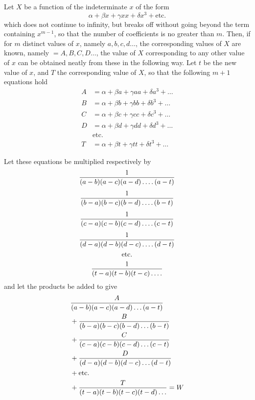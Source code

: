 \begingroup
\renewcommand{\arraystretch}{1.35}
Let $X$ be a function of the indeterminate $x$ of the form
\[
\alpha+\beta x+\gamma xx+\delta x^3+\text{etc.}
\]
which does not continue to infinity, but breaks off without going beyond the term containing $x^{m-1}$, so that the number of coefficients is no greater than $m$. Then, if for $m$ distinct values of $x$, namely $a,b,c,d\ldots$, the corresponding values of $X$ are known, namely $=A,B,C,D\ldots$, the value of $X$ corresponding to any other value of $x$ can be obtained neatly from these in the following way. Let $t$ be the new value of $x$, and $T$ the corresponding value of $X$, so that the following $m+1$ equations hold
\[
\begin{aligned}
A&=\alpha+\beta a+\gamma aa+\delta a^3+\ldots\\
B&=\alpha+\beta b+\gamma bb+\delta b^3+\ldots\\
C&=\alpha+\beta c+\gamma cc+\delta c^3+\ldots\\
D&=\alpha+\beta d+\gamma dd+\delta d^3+\ldots\\
&\text{etc.}\\
T&=\alpha+\beta t+\gamma tt+\delta t^3+\ldots
\end{aligned}
\]
\endgroup
\par
\begingroup
\renewcommand{\arraystretch}{1.45}
Let these equations be multiplied respectively by
\[
\begin{gathered}
\frac{1}{(a-b)(a-c)(a-d)\mathinner{.\,.\,.\,.}(a-t)}\\[4pt]
\frac{1}{(b-a)(b-c)(b-d)\mathinner{.\,.\,.\,.}(b-t)}\\[4pt]
\frac{1}{(c-a)(c-b)(c-d)\mathinner{.\,.\,.\,.}(c-t)}\\[4pt]
\frac{1}{(d-a)(d-b)(d-c)\mathinner{.\,.\,.\,.}(d-t)}\\
\text{etc.}\\
\frac{1}{(t-a)(t-b)(t-c)\mathinner{.\,.\,.\,.}}
\end{gathered}
\]
and let the products be added to give
\[
\begin{aligned}
&\frac{A}{(a-b)(a-c)(a-d)\mathinner{.\,.\,.}(a-t)}\\
&{}+\frac{B}{(b-a)(b-c)(b-d)\mathinner{.\,.\,.}(b-t)}\\
&{}+\frac{C}{(c-a)(c-b)(c-d)\mathinner{.\,.\,.}(c-t)}\\
&{}+\frac{D}{(d-a)(d-b)(d-c)\mathinner{.\,.\,.}(d-t)}\\
&{}+\text{etc.}\\
&{}+\frac{T}{(t-a)(t-b)(t-c)(t-d)\mathinner{.\,.\,.}}=W
\end{aligned}
\]
